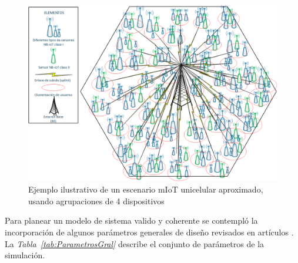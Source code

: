 \begin{figure}[th]
\centering
\includegraphics[scale=.6]{Figures/Escenario mIoT unicelda}
\decoRule
\caption[Ejemplo ilustrativo de un escenario mIoT unicelular aproximado, usando agrupaciones de 4 dispositivos]{Ejemplo ilustrativo de un escenario mIoT unicelular aproximado, usando agrupaciones de 4 dispositivos}
\label{fig:EscenarioMTC}
\end{figure}

Para planear un modelo de sistema valido y coherente se contempló la incorporación de algunos parámetros generales de diseño revisados en artículos \parencite{}. La \textit{Tabla~\ref{tab:ParametrosGral}} describe el conjunto de parámetros de la simulación.

